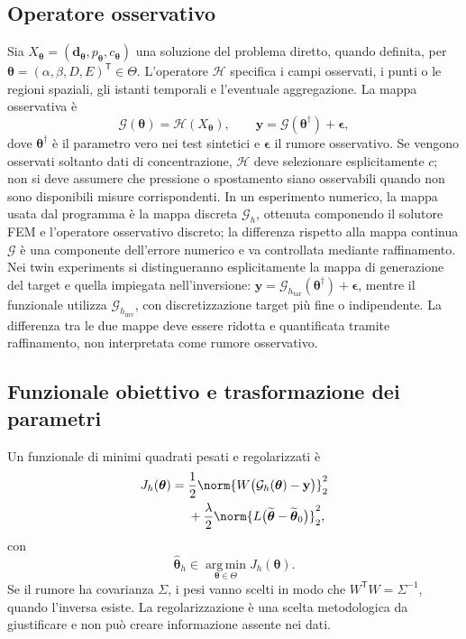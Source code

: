 \subsection{Operatore osservativo}
Sia $X_{\boldsymbol\theta}=(\mathbf d_{\boldsymbol\theta},p_{\boldsymbol\theta},c_{\boldsymbol\theta})$ una soluzione del problema diretto, quando definita, per $\boldsymbol\theta=(\alpha,\beta,D,E)^\mathsf T\in\Theta$. L'operatore $\mathcal H$ specifica i campi osservati, i punti o le regioni spaziali, gli istanti temporali e l'eventuale aggregazione. La mappa osservativa è
\begin{equation}
\mathcal G(\boldsymbol\theta)=\mathcal H(X_{\boldsymbol\theta}),\qquad
\mathbf y=\mathcal G(\boldsymbol\theta^\dagger)+\boldsymbol\epsilon,
\label{eq:observation}
\end{equation}
dove $\boldsymbol\theta^\dagger$ è il parametro vero nei test sintetici e $\boldsymbol\epsilon$ il rumore osservativo. Se vengono osservati soltanto dati di concentrazione, $\mathcal H$ deve selezionare esplicitamente $c$; non si deve assumere che pressione o spostamento siano osservabili quando non sono disponibili misure corrispondenti. In un esperimento numerico, la mappa usata dal programma è la mappa discreta $\mathcal G_h$, ottenuta componendo il solutore FEM e l'operatore osservativo discreto; la differenza rispetto alla mappa continua $\mathcal G$ è una componente dell'errore numerico e va controllata mediante raffinamento. Nei twin experiments si distingueranno esplicitamente la mappa di generazione del target e quella impiegata nell'inversione: $\mathbf y=\mathcal G_{h_{\mathrm{tar}}}(\boldsymbol\theta^\dagger)+\boldsymbol\epsilon$, mentre il funzionale utilizza $\mathcal G_{h_{\mathrm{inv}}}$, con discretizzazione target più fine o indipendente. La differenza tra le due mappe deve essere ridotta e quantificata tramite raffinamento, non interpretata come rumore osservativo.

\subsection{Funzionale obiettivo e trasformazione dei parametri}
Un funzionale di minimi quadrati pesati e regolarizzati è
\begin{equation}
\begin{aligned}
J_h(\boldsymbol\theta)={}&\frac12\norm{W\bigl(\mathcal G_h(\boldsymbol\theta)-\mathbf y\bigr)}_2^2\\
&+\frac{\lambda}{2}\norm{L\bigl(\widetilde{\boldsymbol\theta}-\widetilde{\boldsymbol\theta}_0\bigr)}_2^2,
\end{aligned}
\label{eq:objective}
\end{equation}
con
\[
\widehat{\boldsymbol\theta}_h\in\operatorname*{arg\,min}_{\boldsymbol\theta\in\Theta}J_h(\boldsymbol\theta).
\]
Se il rumore ha covarianza $\Sigma$, i pesi vanno scelti in modo che $W^\mathsf T W=\Sigma^{-1}$, quando l'inversa esiste. La regolarizzazione è una scelta metodologica da giustificare e non può creare informazione assente nei dati.

